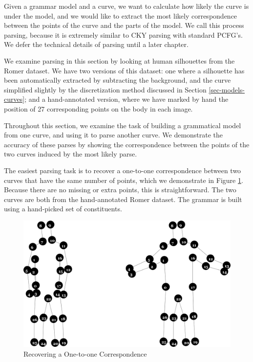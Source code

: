 
Given a grammar model and a curve, we want to calculate how likely the
curve is under the model, and we would like to extract the most likely
correspondence between the points of the curve and the parts of the
model. We call this process parsing, because it is extremely similar
to CKY parsing with standard PCFG's. We defer the technical details of
parsing until a later chapter.

We examine parsing in this section by looking at human silhouettes
from the Romer dataset. We have two versions of this dataset: one
where a silhouette has been automatically extracted by subtracting the
background, and the curve simplified slightly by the discretization
method discussed in Section \ref{sec-models-curves}; and a
hand-annotated version, where we have marked by hand the position of
27 corresponding points on the body in each image. 

Throughout this section, we examine the task of building a grammatical
model from one curve, and using it to parse another curve. We
demonstrate the accuracy of these parses by showing the correspondence
between the points of the two curves induced by the most likely parse.

The easiest parsing task is to recover a one-to-one correspondence
between two curves that have the same number of points, which we
demonstrate in Figure \ref{fig-one-to-one}. Because there are no
missing or extra points, this is straightforward.  The two curves are
both from the hand-annotated Romer dataset. The grammar is built using
a hand-picked set of constituents.

\begin{figure}
\includegraphics[width=\linewidth]{output/1.models/one_to_one/parse.png}
\caption{Recovering a One-to-one Correspondence}
\label{fig-one-to-one}
\end{figure}

